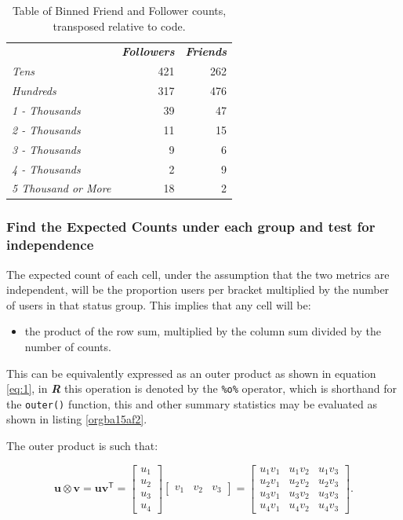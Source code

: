 \documentclass[11pt]{article}
\begin{document}
\begin{table}[htbp]
\caption{\label{tab:orgc5219a2}Table of Binned Friend and Follower counts, transposed relative to code.}
\centering
\begin{tabular}{lrr}
 & \textbf{\textbf{\emph{Followers}}} & \textbf{\textbf{\emph{Friends}}}\\
\emph{Tens} & 421 & 262\\
\emph{Hundreds} & 317 & 476\\
\emph{1 - Thousands} & 39 & 47\\
\emph{2 - Thousands} & 11 & 15\\
\emph{3 - Thousands} & 9 & 6\\
\emph{4 - Thousands} & 2 & 9\\
\emph{5 Thousand or More} & 18 & 2\\
\end{tabular}
\end{table}

\subsubsection{Find the Expected Counts under each group and test for independence}
\label{sec:org9a6e320}
The expected count of each cell, under the assumption that the two metrics are
independent, will be the proportion users per bracket multiplied by the number
of users in that status group. This implies that any cell will be:

\begin{itemize}
\item the product of the row sum, multiplied by the column sum divided by the number of counts.
\end{itemize}

This can be equivalently expressed as an outer product as shown in equation
\eqref{eq:1}, in \textbf{\emph{R}} this operation is denoted by the \texttt{\%o\%} operator, which is
shorthand for the \texttt{outer()} function, this and other summary statistics may be
evaluated as shown in listing \ref{orgba15af2}.

The outer product is such that:


$$
\mathbf{u} \otimes \mathbf {v} =\mathbf {u} \mathbf {v} ^{\textsf {T}}={\begin{bmatrix}u_{1}\\u_{2}\\u_{3}\\u_{4}\end{bmatrix}}{\begin{bmatrix}v_{1}&v_{2}&v_{3}\end{bmatrix}}={\begin{bmatrix}u_{1}v_{1}&u_{1}v_{2}&u_{1}v_{3}\\u_{2}v_{1}&u_{2}v_{2}&u_{2}v_{3}\\u_{3}v_{1}&u_{3}v_{2}&u_{3}v_{3}\\u_{4}v_{1}&u_{4}v_{2}&u_{4}v_{3}\end{bmatrix}}.
$$
\end{document}
